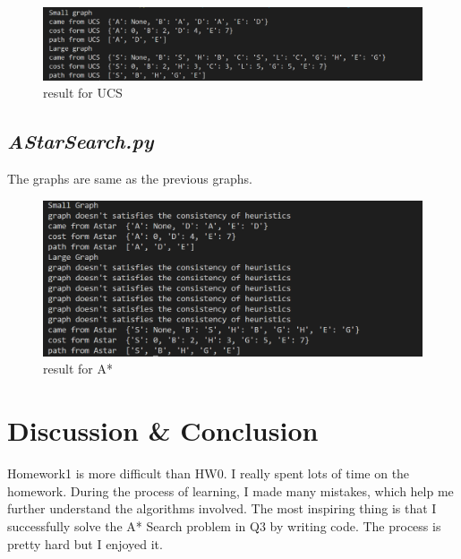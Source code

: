 \documentclass[aps,letterpaper,10pt]{revtex4}
\begin{document}
\begin{figure}[h]
	\centering
	\includegraphics[width=1\textwidth]{UCS_result.png}
	\caption{result for UCS}
	\label{fig:label}
\end{figure}



\subsection{\emph{AStarSearch.py}}

The graphs are same as the previous graphs.
\begin{figure}[h]
	\centering
	\includegraphics[width=1\textwidth]{AstarResult.png}
	\caption{result for A*}
	\label{fig:label}
\end{figure}



\newpage







\section{Discussion \& Conclusion}

Homework1 is more difficult than HW0. I really spent lots of time on the homework. During the process of learning, I 
made many mistakes, which help me further understand the algorithms involved. The most inspiring thing is that I successfully 
solve the A* Search problem in Q3 by writing code. The process is pretty hard but I enjoyed it.
\end{document}
